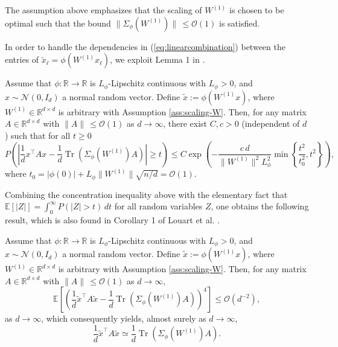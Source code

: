 \documentclass{article}
\begin{document}
\bigskip
\par
The assumption above emphasizes that the scaling of $W^{(1)}$ is chosen to be optimal such that the bound $\|\Sigma_\phi(W^{(1)})\|\,\leq\mathcal{O}(1)$ is satisfied.
\bigskip
\par
In order to handle the dependencies in (\ref{eq:linearcombination}) between the entries of $\tilde{x}_\ell=\phi(W^{(1)}x_\ell)$, we exploit Lemma 1 in \cite{louart}.
\bigskip
\begin{lemma}
Assume that $\phi:\mathbb{R}\to\mathbb{R}$ is $L_\phi$-Lipschitz continuous with $L_\phi>0$, and $x\sim\mathcal{N}(0,I_d)$ a normal random vector. Define $\tilde{x}:=\phi(W^{(1)}x)$, where $W^{(1)}\in\mathbb{R}^{d\times d}$ is arbitrary with Assumption \ref{ass:scaling-W}. Then, for any matrix $A\in\mathbb{R}^{d\times d}$ with $\|A\|\,\leq\mathcal{O}(1)$ as $d\to\infty$, there exist $C,c>0$ (independent of $d$) such that for all $t\geq0$
$$P\left(\left|\frac{1}{d}x^\top A x-\frac{1}{d}\operatorname{Tr}\left(\Sigma_\phi(W^{(1)})A\right)\right|\geq t\right)\leq C\exp\left(-\frac{c\,d}{\|W^{(1)}\|^2L_\phi^2}\min\left\{\frac{t^2}{t_0^2},t^2\right\}\right),$$
where $t_0=|\phi(0)|+L_\phi\|W^{(1)}\|\sqrt{n/d}=\mathcal{O}(1)$.\label{thm:louart}
\end{lemma}
\bigskip
\par
Combining the concentration inequality above with the elementary fact that 
\\$\mathbb{E}[|Z|]=\int_0^\infty P(|Z|>t)\,dt$ for all random variables $Z$, one obtains the following result, which is also found in Corollary 1 of Louart et al. \cite{louart}.
\bigskip
\begin{corollary} Assume that $\phi:\mathbb{R}\to\mathbb{R}$ is $L_\phi$-Lipschitz continuous with $L_\phi>0$, and $x\sim\mathcal{N}(0,I_d)$ a normal random vector. Define $\tilde{x}:=\phi(W^{(1)}x)$, where $W^{(1)}\in\mathbb{R}^{d\times d}$ is arbitrary with Assumption \ref{ass:scaling-W}. Then, for any matrix $A\in\mathbb{R}^{d\times d}$ with $\|A\|\,\leq\mathcal{O}(1)$ as $d\to\infty$,
\begin{equation*}
\mathbb{E}\left[\left(\frac{1}{d}\tilde{x}^\top A \tilde{x}-\frac{1}{d}\operatorname{Tr}\left(\Sigma_\phi(W^{(1)})A\right)\right)^4\right]\leq\mathcal{O}(d^{-2}),
\end{equation*}
as $d\to\infty$, which consequently yields, almost surely as $d\to\infty$,
$$\frac{1}{d}\tilde{x}^\top A\tilde{x}\simeq\frac{1}{d}\operatorname{Tr}\left(\Sigma_\phi(W^{(1)})A\right).$$\label{thm:trace-lemma2}
\end{corollary}
\end{document}
